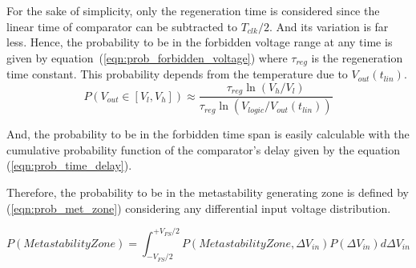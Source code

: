 

For the sake of simplicity, only the regeneration time is considered since the linear time of comparator can be subtracted to $T_{clk}/2$. And its variation is far less. Hence, the probability to be in the forbidden voltage range at any time is given by equation~(\ref{eqn:prob_forbidden_voltage}) where $\tau_{reg}$ is the regeneration time constant. This probability depends from the temperature due to $V_{out}(t_{lin})$.
\vspace{10pt}
\begin{equation}
P(V_{out} \in [V_l, V_h]) \approx \frac{\tau_{reg}\ln(V_h/V_l)}{\tau_{reg}\ln(V_{logic}/ V_{out}(t_{lin}))}
\label{eqn:prob_forbidden_voltage}
\end{equation}

And, the probability to be in the forbidden time span is easily calculable %
with the cumulative probability function of the comparator's delay given by the equation (\ref{eqn:prob_time_delay})\cite{metastability_figueiredo_2013}.



Therefore, the probability to be in the metastability generating zone is defined by (\ref{eqn:prob_met_zone}) considering any differential input voltage distribution.

\vspace{-6pt}
\begin{equation}
P(Metastability Zone) = \int_{-V_{FS}/2}^{+V_{FS}/2}{P(Metastability Zone, \Delta V_{in})P(\Delta V_{in})d\Delta V_{in}} \label{eqn:prob_met_zone}
\end{equation}



